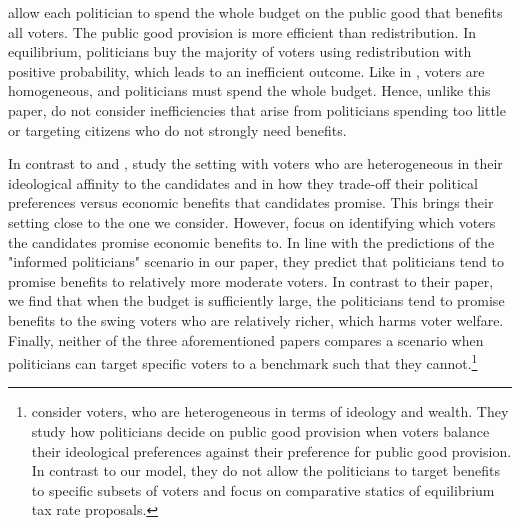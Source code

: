 \documentclass[12pt,english]{article}
\begin{document}
\cite{lizzeri2001provision} allow each politician to spend the whole budget on the public good that benefits all voters. The public good provision is more efficient than redistribution. In equilibrium, politicians buy the majority of voters using redistribution with positive probability, which leads to an inefficient outcome. Like in \cite{myerson1993incentives}, voters are homogeneous, and politicians must spend the whole budget. Hence, unlike this paper, \cite{lizzeri2001provision} do not consider inefficiencies that arise from politicians spending too little or targeting citizens who do not strongly need benefits. 

In contrast to \cite{myerson1993incentives} and \cite{lizzeri2001provision}, \cite{dixit1996determinants} study the setting with voters who are heterogeneous in their ideological affinity to the candidates and in how they trade-off their political preferences versus economic benefits that candidates promise. This brings their setting close to the one we consider. However, \cite{dixit1996determinants} focus on identifying which voters the candidates promise economic benefits to. In line with the predictions of the "informed politicians" scenario in our paper, they predict that politicians tend to promise benefits to relatively more moderate voters.  In contrast to their paper, we find that when the budget is sufficiently large, the politicians tend to promise benefits to the swing voters who are relatively richer, which harms voter welfare. Finally, neither of the three aforementioned papers compares a scenario when politicians can target specific voters to a benchmark such that they cannot.\footnote{\cite{krasa2014social} consider voters, who are heterogeneous in terms of ideology and wealth. They study how politicians decide on public good provision when voters balance their ideological preferences against their preference for public good provision. In contrast to our model, they do not allow the politicians to target benefits to specific subsets of voters and focus on comparative statics of equilibrium tax rate proposals.} 
\end{document}
